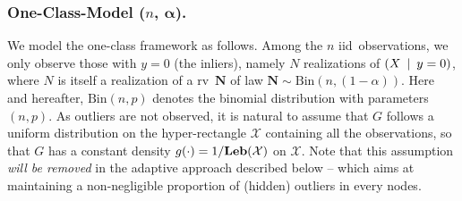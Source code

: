 \subsubsection{One-Class-Model ($n$, $\boldsymbol{\alpha}$).} We model the
one-class framework as follows. Among the $n$ \acs{iid}~observations, we only
observe those with $y=0$ (the inliers), namely $N$ realizations of $(
X\enskip|\enskip y=0)$, where $N$ is itself a realization of a
\acs{rv}~$\mathbf{N}$ of law $\mathbf{N} \sim \text{Bin}(n,
(1-\alpha))$. Here and hereafter, $\text{Bin}(n, p)$ denotes the binomial
distribution with parameters $(n, p)$.  As outliers are not observed, it is
natural to assume that $G$ follows a uniform distribution on the
hyper-rectangle $\mathcal{X}$ containing all the observations, so that $G$ has
a constant density $g(\cdot) = 1 / \mathbf{Leb}(\mathcal{X})$ on $\mathcal{X}$.
Note that this assumption \emph{will be removed} in the adaptive approach
described below -- which aims at maintaining a non-negligible proportion of
(hidden) outliers in every nodes.
